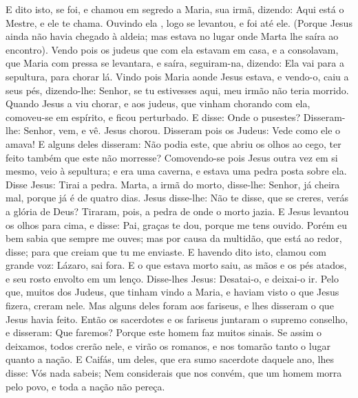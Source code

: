 {  E dito isto,
{} se foi, e chamou em segredo a Maria, sua irmã, dizendo: Aqui está o Mestre, e ele te chama.
  Ouvindo ela
{}, logo se levantou, e foi até ele.
  (Porque Jesus ainda não havia chegado à aldeia; mas estava no lugar onde Marta lhe saíra ao encontro).
  Vendo pois os judeus que com ela estavam em casa, e a consolavam, que Maria com pressa se levantara, e saíra, seguiram-na, dizendo: Ela vai para a sepultura, para chorar lá.
  Vindo pois Maria aonde Jesus estava, e vendo-o, caiu a seus pés, dizendo-lhe: Senhor, se tu estivesses aqui, meu irmão não teria morrido.
  Quando Jesus a viu chorar, e aos judeus, que vinham chorando com ela, comoveu-se em espírito, e ficou perturbado.
  E disse: Onde o pusestes? Disseram-lhe: Senhor, vem, e vê.
  Jesus chorou.
  Disseram pois os Judeus: Vede como ele o amava!
  E alguns deles disseram: Não podia este, que abriu os olhos ao cego, ter feito também que este não morresse?
  Comovendo-se pois Jesus outra vez em si mesmo, veio à sepultura; e era
{} uma caverna, e estava uma pedra posta sobre ela.
  Disse Jesus: Tirai a pedra. Marta, a irmã do morto, disse-lhe: Senhor, já cheira mal, porque já é de quatro dias.
  Jesus disse-lhe: Não te disse, que se creres, verás a glória de Deus?
  Tiraram, pois, a pedra de onde o morto jazia. E Jesus levantou os olhos para cima, e disse: Pai, graças te dou, porque me tens ouvido.
  Porém eu bem sabia que sempre me ouves; mas por causa da multidão, que está ao redor,
{} disse; para que creiam que tu me enviaste.
  E havendo dito isto, clamou com grande voz: Lázaro, sai fora.
  E o que estava morto saiu,
{} as mãos e os pés atados, e seu rosto envolto em um lenço. Disse-lhes Jesus: Desatai-o, e deixai-o ir.
  Pelo que, muitos dos Judeus, que tinham vindo a Maria, e haviam visto o que Jesus fizera, creram nele.
  Mas alguns deles foram aos fariseus, e lhes disseram o que Jesus havia feito.
  Então os sacerdotes e os fariseus juntaram o supremo conselho,
 e disseram: Que faremos? Porque este homem faz muitos sinais.
  Se assim o deixamos, todos crerão nele, e virão os romanos, e nos tomarão tanto o lugar quanto a nação.
  E Caifás, um deles, que era sumo sacerdote daquele ano, lhes disse: Vós nada sabeis;
  Nem considerais que nos convém, que um homem morra pelo povo, e toda a nação não pereça.
}
